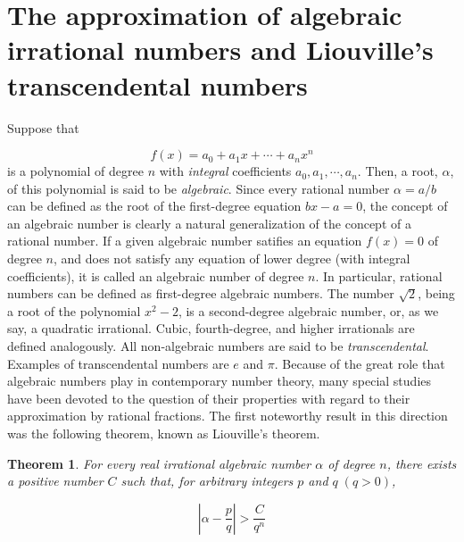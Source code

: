 \documentclass{article}
\newtheorem{theorem}{Theorem}
\begin{document}
\section{The approximation of algebraic irrational numbers and Liouville's transcendental numbers}
Suppose that

\begin{equation}
     f(x) = a_0 + a_1x + \cdots + a_nx^n   \label{polyn}
\end{equation}
is a polynomial of degree $n$ with {\em integral} coefficients $a_0, a_1, \cdots, a_n$. Then,
a root, $\alpha$, of this polynomial is said to be {\em algebraic}. Since every rational
number $\alpha = a/b$ can be defined as the root of the first-degree equation
$bx-a = 0$, the concept of an algebraic number is clearly a natural generalization of the concept of 
a rational number. If a given algebraic number satifies an equation $f(x)=0$ of degree $n$, and does
not satisfy any equation of lower degree (with integral coefficients), it is called an algebraic number of degree
$n$. In particular, rational numbers can be defined as first-degree algebraic numbers. The number
$\sqrt{2}$, being a root of the polynomial $x^2 -2$, is a second-degree algebraic number, or, 
as we say, a quadratic irrational. Cubic, fourth-degree, and higher irrationals are defined analogously. All
non-algebraic numbers are said to be {\em transcendental}. Examples of transcendental numbers
are $e$ and $\pi$. Because of the great role that algebraic numbers play in contemporary number theory,
many special studies have been devoted to the question of their properties with regard to their
approximation by rational fractions. The first noteworthy result in this direction was the following theorem, known as Liouville's
theorem.

\begin{theorem} \label{liouville}
For every real irrational algebraic number $\alpha$ of degree $n$,
there exists a positive number $C$ such that, for arbitrary integers $p$ and $q \; (q>0)$,

\begin{equation*}
   \left| \alpha - \frac{p}{q} \right| >  \frac{C}{q^n}
\end{equation*}
\end{theorem}
\end{document}
